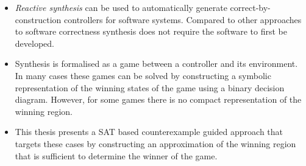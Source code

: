 \begin{itemize}

    \item \emph{Reactive synthesis} can be used to automatically generate correct-by-construction controllers for software systems. Compared to other approaches to software correctness synthesis does not require the software to first be developed.

    \item Synthesis is formalised as a game between a controller and its environment. In many cases these games can be solved by constructing a symbolic representation of the winning states of the game using a binary decision diagram. However, for some games there is no compact representation of the winning region.

    \item This thesis presents a SAT based counterexample guided approach that targets these cases by constructing an approximation of the winning region that is sufficient to determine the winner of the game.

\end{itemize}







